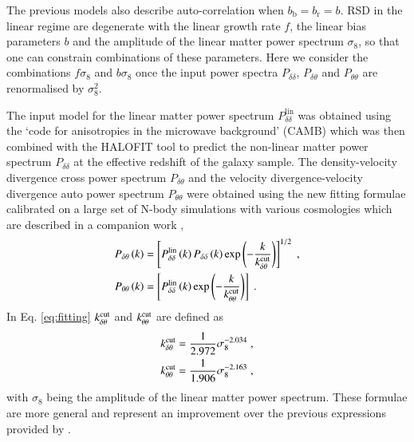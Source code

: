 \documentclass[longauth]{aa}
\def\({\left(}
\def\){\right)}
\def\[{\left[}
\def\]{\right]}
\newcommand*\pdt{P_{\delta\theta}\(k\)}
\newcommand*\ptt{P_{\theta\theta}\(k\)}
\begin{document}
The previous models also describe auto-correlation when $b_{\mathrm{b}}=b_{\mathrm{r}}=b$. RSD in the linear regime are degenerate with the linear growth rate $f$, the linear bias parameters $b$ and the amplitude of the linear matter power spectrum $\sigma_8$, so that one can constrain combinations of these parameters. Here we consider the combinations $f\sigma_8$ and $b\sigma_8$ once the input power spectra $P_{\delta\delta}$, $P_{\delta\theta}$ and $P_{\theta\theta}$ are renormalised by $\sigma_8^2$.

The input model for the linear matter power spectrum $P^{\mathrm{lin}}_{\delta\delta}$ was obtained using the `code for anisotropies in the microwave background' (CAMB) \citep{lewis00} which was then combined with the HALOFIT tool \citep{takahashi12} to predict the non-linear matter power spectrum $P_{\delta\delta}$ at the effective redshift of the galaxy sample. The density-velocity divergence cross power spectrum $P_{\delta\theta}$ and the velocity divergence-velocity divergence auto power spectrum $P_{\theta\theta}$ were obtained using the new fitting formulae calibrated on a large set of N-body simulations with various cosmologies \citep[DEMNUni:][]{carbone16} which are described in a companion work \citep[][in preparation]{bel17},
\begin{subequations}
                \label{eq:fitting}
                \begin{align}
                        \pdt            &=\[P_{\delta\delta}^{\rm{lin}}\(k\)P_{\delta\delta}\(k\)\exp\(-\frac{k}{k_{\delta\theta}^{\rm{cut}}}\)	\]^{1/2}\; ,\\
                        \ptt            &=\[P_{\delta\delta}^{\rm{lin}}\(k\)\exp\(-\frac{k}{k_{\theta\theta}^{\rm{cut}}}\)\]\; .
                \end{align}
        \end{subequations}
In Eq. \eqref{eq:fitting} $k_{\delta\theta}^{\rm{cut}}$ and $k_{\theta\theta}^{\rm{cut}}$ are defined as
	\begin{subequations}
		\label{eq:kcut}
        \begin{align}
			k_{\delta\theta}^{\rm{cut}}           &=\frac{1}{2.972}\sigma_8^{-2.034}\; ,\\
			k_{\theta\theta}^{\rm{cut}}           &=\frac{1}{1.906}\sigma_8^{-2.163}\; ,
		\end{align}
	\end{subequations}
with $\sigma_8$ being the amplitude of the linear matter power spectrum. These formulae are more general and represent an improvement over the previous expressions provided by \cite{jennings11}.
\end{document}

